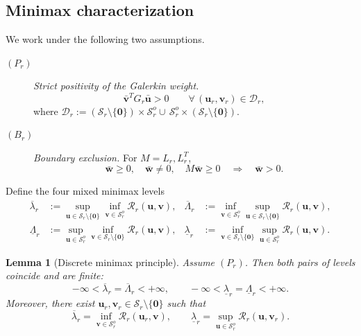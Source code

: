 \documentclass[10pt,a4paper]{amsart}
\newtheorem{lemma}{Lemma}
\begin{document}
\subsection{Minimax characterization}

We work under the following two assumptions.

\begin{description}
	\item[$(P_r)$] \emph{Strict positivity of the Galerkin weight.}
	\[
	\bar{\mathbf{v}}^T G_r\bar{\mathbf{u}}>0
	\qquad
	\forall\,(\mathbf{u}_r,\mathbf{v}_r)\in\mathcal{D}_r,
	\]
	where $\mathcal{D}_r:=(\mathcal{S}_r\setminus\{\mathbf{0}\})\times\mathcal{S}_r^o
	\cup\,\mathcal{S}_r^o\times(\mathcal{S}_r\setminus\{\mathbf{0}\})$.
	
	\item[$(B_r)$] \emph{Boundary exclusion.} For $M=L_r,L_r^T$,
	\[
	\bar{\mathbf{w}}\ge0,\quad
	\bar{\mathbf{w}}\ne0,\quad
	M\bar{\mathbf{w}}\ge0
	\quad\Longrightarrow\quad
	\bar{\mathbf{w}}>0.
	\]
\end{description}

Define the four mixed minimax levels
\begin{align}
	\overline\lambda_r
	&:= \sup_{\mathbf{u}\in\mathcal{S}_r\setminus\{\mathbf{0}\}}
	\inf_{\mathbf{v}\in\mathcal{S}_r^o}
	\mathcal{R}_r(\mathbf{u},\mathbf{v}),
	&
	\overline\Lambda_r
	&:= \inf_{\mathbf{v}\in\mathcal{S}_r^o}
	\sup_{\mathbf{u}\in\mathcal{S}_r\setminus\{\mathbf{0}\}}
	\mathcal{R}_r(\mathbf{u},\mathbf{v}),
	\label{eq:discrete-upper-minimax}\\
	\underline\Lambda_r
	&:= \sup_{\mathbf{u}\in\mathcal{S}_r^o}
	\inf_{\mathbf{v}\in\mathcal{S}_r\setminus\{\mathbf{0}\}}
	\mathcal{R}_r(\mathbf{u},\mathbf{v}),
	&
	\underline\lambda_r
	&:= \inf_{\mathbf{v}\in\mathcal{S}_r\setminus\{\mathbf{0}\}}
	\sup_{\mathbf{u}\in\mathcal{S}_r^o}
	\mathcal{R}_r(\mathbf{u},\mathbf{v}).
	\label{eq:discrete-lower-minimax}
\end{align}

\begin{lemma}[Discrete minimax principle]\label{lem:discrete-minimax}
	Assume $(P_r)$. Then both pairs of levels coincide and are finite:
	\[
	-\infty < \overline\lambda_r = \overline\Lambda_r < +\infty,
	\qquad
	-\infty < \underline\lambda_r = \underline\Lambda_r < +\infty.
	\]
	Moreover, there exist $\mathbf{u}_r,\mathbf{v}_r\in\mathcal{S}_r\setminus\{\mathbf{0}\}$
	such that
	\begin{equation}\label{eq:minmaxD2}
		\overline\lambda_r
		= \inf_{\mathbf{v}\in\mathcal{S}_r^o}\mathcal{R}_r(\mathbf{u}_r,\mathbf{v}),
		\qquad
		\underline\lambda_r
		= \sup_{\mathbf{u}\in\mathcal{S}_r^o}\mathcal{R}_r(\mathbf{u},\mathbf{v}_r).
	\end{equation}
\end{lemma}
\end{document}
